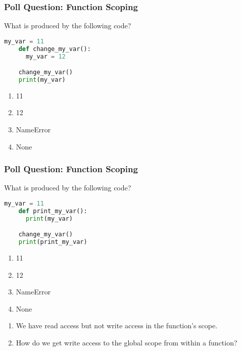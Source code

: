 \documentclass{beamer}
\begin{document}
%
%
%
\begin{frame}[fragile]
  \frametitle{Poll Question: Function Scoping}
  \begin{minipage}{0.69\textwidth}
    What is produced by the following code?
    \begin{lstlisting}[language=Python, autogobble]
    my_var = 11
    def change_my_var():
      my_var = 12

    change_my_var()
    print(my_var)
    \end{lstlisting}
  \end{minipage}
  \hfill
  \begin{minipage}{0.29\textwidth}
    \begin{enumerate}[A]
      \item 11
      \item 12
      \item NameError
      \item None
    \end{enumerate}
  \end{minipage}
\end{frame}

%
%
%
\begin{frame}[fragile]
  \frametitle{Poll Question: Function Scoping}
  \begin{minipage}{0.69\textwidth}
    What is produced by the following code?
    \begin{lstlisting}[language=Python, autogobble]
    my_var = 11
    def print_my_var():
      print(my_var)

    change_my_var()
    print(print_my_var)
    \end{lstlisting}
  \end{minipage}
  \hfill
  \begin{minipage}{0.29\textwidth}
    \begin{enumerate}[A]
      \item 11
      \item 12
      \item NameError
      \item None
    \end{enumerate}
  \end{minipage}
  \pause
  \vfill
  \begin{enumerate}
    \item We have read access but not write access in the function's scope. 
    \item How do we get write access to the global scope from within a function?
  \end{enumerate}
\end{frame}
\end{document}
